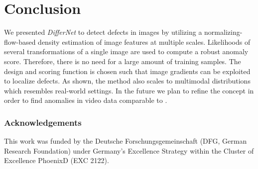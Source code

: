 \documentclass[10pt,twocolumn,letterpaper]{article}
\begin{document}
\section{Conclusion}
We presented \textit{DifferNet} to detect defects in images by utilizing a normalizing-flow-based density estimation of image features at multiple scales.
Likelihoods of several transformations of a single image are used to compute a robust anomaly score.
Therefore, there is no need for a large amount of training samples.
The design and scoring function is chosen such that image gradients can be exploited to localize defects. 
As shown, the method also scales to multimodal distributions which resembles real-world settings.
In the future we plan to refine the concept in order to find anomalies in video data comparable to \cite{wentong_ano, wentong_ano2}.


\subsubsection*{Acknowledgements} This work was funded by the Deutsche Forschungsgemeinschaft (DFG, German Research
Foundation) under Germany's Excellence Strategy within the Cluster of Excellence PhoenixD (EXC 2122).

\newpage
\clearpage
{\small


}
\end{document}
